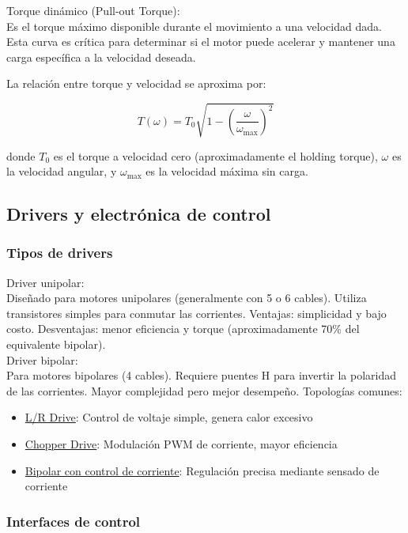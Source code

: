 Torque dinámico (Pull-out Torque):\\
\noindent
Es el torque máximo disponible durante el movimiento a una velocidad dada. Esta curva es crítica para determinar si el motor puede acelerar y mantener una carga específica a la velocidad deseada.

La relación entre torque y velocidad se aproxima por:

\begin{equation}
T(\omega) = T_0 \sqrt{1 - \left(\frac{\omega}{\omega_{\max}}\right)^2}
\end{equation}

donde $T_0$ es el torque a velocidad cero (aproximadamente el holding torque), $\omega$ es la velocidad angular, y $\omega_{\max}$ es la velocidad máxima sin carga.

\subsection{Drivers y electrónica de control}

\subsubsection{Tipos de drivers}

Driver unipolar:\\
\noindent
Diseñado para motores unipolares (generalmente con 5 o 6 cables). Utiliza transistores simples para conmutar las corrientes. Ventajas: simplicidad y bajo costo. Desventajas: menor eficiencia y torque (aproximadamente 70\% del equivalente bipolar).\\

Driver bipolar:\\
\noindent
Para motores bipolares (4 cables). Requiere puentes H para invertir la polaridad de las corrientes. Mayor complejidad pero mejor desempeño. Topologías comunes:

\begin{itemize}[label=$\bullet$]
    \item \underline{L/R Drive}: Control de voltaje simple, genera calor excesivo
    \item \underline{Chopper Drive}: Modulación PWM de corriente, mayor eficiencia
    \item \underline{Bipolar con control de corriente}: Regulación precisa mediante sensado de corriente
\end{itemize}

\subsubsection{Interfaces de control}

